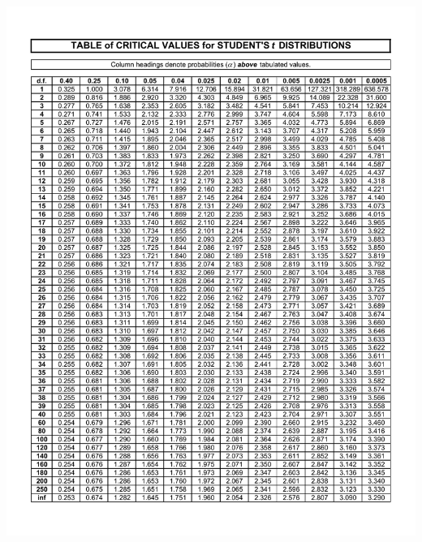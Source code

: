 \documentclass[11pt]{article}
\begin{document}
    \begin{minipage}{0.99\textwidth}
        \centering
        \includegraphics[width = .95\textwidth]{img/Tabella_Student}
    \end{minipage}
\end{document}
